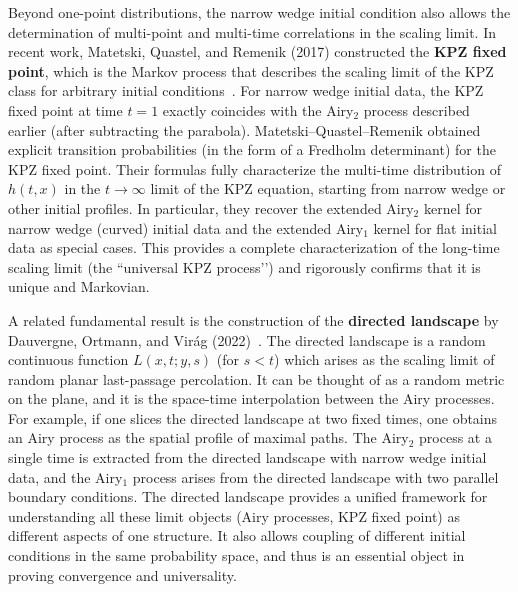 \documentclass[letterpaper,11pt,oneside,reqno]{article}
\numberwithin{equation}{section}
\theoremstyle{definition}
\begin{document}
Beyond one-point distributions, the narrow wedge initial condition also allows the determination of multi-point and multi-time correlations in the scaling limit. In recent work, Matetski, Quastel, and Remenik (2017) constructed the \textbf{KPZ fixed point}, which is the Markov process that describes the scaling limit of the KPZ class for arbitrary initial conditions \cite{MatetskiQuastelRemenik2017}. For narrow wedge initial data, the KPZ fixed point at time $t=1$ exactly coincides with the Airy$_2$ process described earlier (after subtracting the parabola). Matetski–Quastel–Remenik obtained explicit transition probabilities (in the form of a Fredholm determinant) for the KPZ fixed point. Their formulas fully characterize the multi-time distribution of $h(t,x)$ in the $t\to\infty$ limit of the KPZ equation, starting from narrow wedge or other initial profiles. In particular, they recover the extended Airy$_2$ kernel for narrow wedge (curved) initial data and the extended Airy$_1$ kernel for flat initial data as special cases. This provides a complete characterization of the long-time scaling limit (the ``universal KPZ process’’) and rigorously confirms that it is unique and Markovian.

A related fundamental result is the construction of the \textbf{directed landscape} by Dauvergne, Ortmann, and Virág (2022) \cite{DauvergneOrtmannVirag2022}. The directed landscape is a random continuous function $L(x,t; y,s)$ (for $s<t$) which arises as the scaling limit of random planar last-passage percolation. It can be thought of as a random metric on the plane, and it is the space-time interpolation between the Airy processes. For example, if one slices the directed landscape at two fixed times, one obtains an Airy process as the spatial profile of maximal paths. The Airy$_2$ process at a single time is extracted from the directed landscape with narrow wedge initial data, and the Airy$_{1}$ process arises from the directed landscape with two parallel boundary conditions. The directed landscape provides a unified framework for understanding all these limit objects (Airy processes, KPZ fixed point) as different aspects of one structure. It also allows coupling of different initial conditions in the same probability space, and thus is an essential object in proving convergence and universality.
\end{document}
